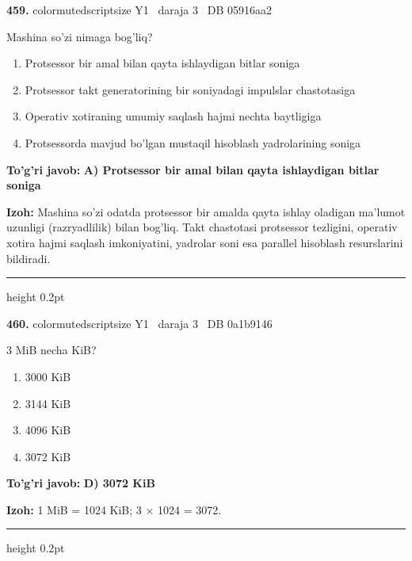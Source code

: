 \documentclass[10pt,a4paper,oneside]{article}
\begin{document}
\noindent\textbf{\color{ink}459.}  {color{muted}scriptsize Y1 \textbullet\ daraja 3 \textbullet\ DB 05916aa2}
\par
Mashina so'zi nimaga bog'liq?
\begin{enumerate}[label=\Alph*),leftmargin=9mm]
\item Protsessor bir amal bilan qayta ishlaydigan bitlar soniga
\item Protsessor takt generatorining bir soniyadagi impulslar chastotasiga
\item Operativ xotiraning umumiy saqlash hajmi nechta baytligiga
\item Protsessorda mavjud bo'lgan mustaqil hisoblash yadrolarining soniga
\end{enumerate}
\begin{tcolorbox}[enhanced,breakable,colback=teal!4,colframe=teal!50!black,boxrule=0.5pt,arc=1.1mm,left=3mm,right=3mm,top=1.7mm,bottom=1.7mm,before skip=2mm,after skip=2mm]
\textbf{\color{teal}To'g'ri javob:} \textbf{A) Protsessor bir amal bilan qayta ishlaydigan bitlar soniga}
\par\smallskip
\textbf{Izoh:} Mashina so'zi odatda protsessor bir amalda qayta ishlay oladigan ma'lumot uzunligi (razryadlilik) bilan bog'liq. Takt chastotasi protsessor tezligini, operativ xotira hajmi saqlash imkoniyatini, yadrolar soni esa parallel hisoblash resurslarini bildiradi.
\end{tcolorbox}
\vspace{2mm}\hrule height 0.2pt \vspace{3mm}

\noindent\textbf{\color{ink}460.}  {color{muted}scriptsize Y1 \textbullet\ daraja 3 \textbullet\ DB 0a1b9146}
\par
3 MiB necha KiB?
\begin{enumerate}[label=\Alph*),leftmargin=9mm]
\item 3000 KiB
\item 3144 KiB
\item 4096 KiB
\item 3072 KiB
\end{enumerate}
\begin{tcolorbox}[enhanced,breakable,colback=teal!4,colframe=teal!50!black,boxrule=0.5pt,arc=1.1mm,left=3mm,right=3mm,top=1.7mm,bottom=1.7mm,before skip=2mm,after skip=2mm]
\textbf{\color{teal}To'g'ri javob:} \textbf{D) 3072 KiB}
\par\smallskip
\textbf{Izoh:} 1 MiB = 1024 KiB; 3 \ensuremath{\times} 1024 = 3072.
\end{tcolorbox}
\vspace{2mm}\hrule height 0.2pt \vspace{3mm}
\end{document}
